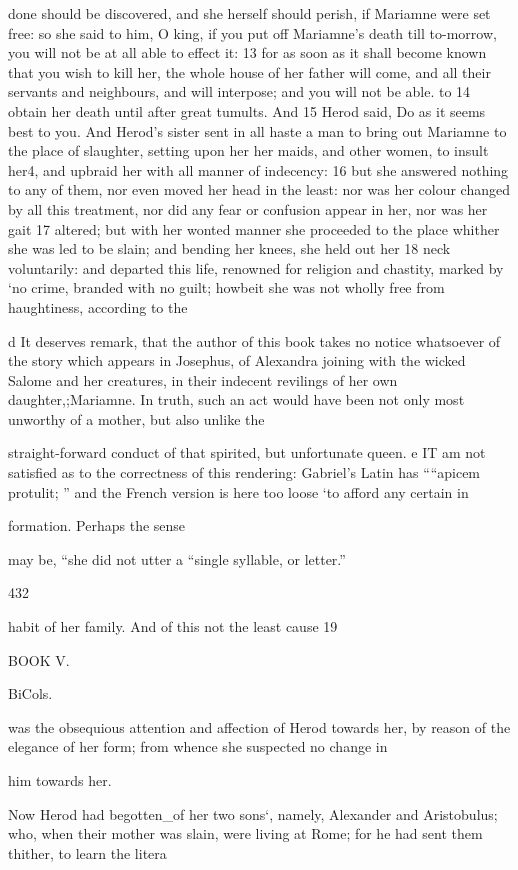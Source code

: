 done should be discovered, and she herself should perish, if Mariamne were set free: so she said to him, O king, if you put off Mariamne’s death till to-morrow, you will not be at all able to effect it: 13 for as soon as it shall become known that you wish to kill her, the whole house of her father will come, and all their servants and neighbours, and will interpose; and you will not be able. to 14 obtain her death until after great tumults. And 15 Herod said, Do as it seems best to you. And Herod’s sister sent in all haste a man to bring out Mariamne to the place of slaughter, setting upon her her maids, and other women, to insult her4, and upbraid her with all manner of indecency: 16 but she answered nothing to any of them, nor even moved her head in the least: nor was her colour changed by all this treatment, nor did any fear or confusion appear in her, nor was her gait 17 altered; but with her wonted manner she proceeded to the place whither she was led to be slain; and bending her knees, she held out her 18 neck voluntarily: and departed this life, renowned for religion and chastity, marked by ‘no crime, branded with no guilt; howbeit she was not wholly free from haughtiness, according to the 

d It deserves remark, that the author of this book takes no notice whatsoever of the story which appears in Josephus, of Alexandra joining with the wicked Salome and her creatures, in their indecent revilings of her own daughter,;Mariamne. In truth, such an act would have been not only most unworthy of a mother, but also unlike the 

straight-forward conduct of that spirited, but unfortunate queen. 
e IT am not satisfied as to the correctness of this rendering: Gabriel’s Latin has ““apicem protulit; ” and the French version is here too loose ‘to afford any certain in

formation. Perhaps the sense 

may be, “she did not utter a “single syllable, or letter.” 

432 

habit of her family. And of this not the least cause 19 

BOOK V. 

BiCols. 

was the obsequious attention and affection of Herod towards her, by reason of the elegance of her form; from whence she suspected no change in 

him towards her. 

Now Herod had begotten_of her two sons‘, namely, Alexander and Aristobulus; who, when their mother was slain, were living at Rome; for he had sent them thither, to learn the litera

